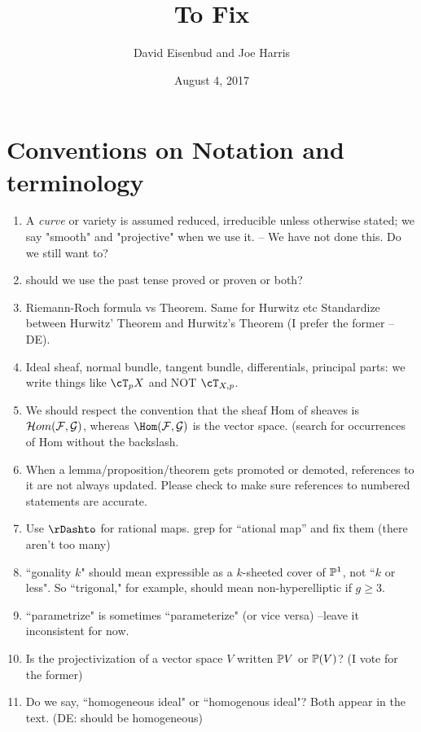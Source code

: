 \documentclass[12pt, leqno]{book}
\date{August 4, 2017}
\title{To Fix}
\author{David Eisenbud and Joe Harris }
\begin{document}
\maketitle

\setlength{\parskip}{5pt}

 
 \section{Conventions on Notation and terminology}
\begin{enumerate}

\item A \emph{curve} or variety is assumed  reduced, irreducible unless otherwise stated; we say "smooth" and "projective" when we use it. -- We have not done this. Do we still want to?

\item should we use the past tense proved or proven or both?

\item Riemann-Roch formula vs Theorem. Same for Hurwitz etc Standardize between Hurwitz' Theorem and Hurwitz's Theorem (I prefer the former -- DE).

\item Ideal sheaf, normal bundle, tangent bundle, differentials, principal parts: we write things like 
$\cT_{p}X$ and NOT $\cT_{X,p}$.  

\item We should respect the convention that the sheaf Hom of sheaves is
$\cH om(\cF,\cG)$, whereas $\Hom(\cF,\cG)$ is the vector space. (search for occurrences of Hom without the backslash.

\item When a lemma/proposition/theorem gets promoted or demoted, references to it are not always updated. Please check to make sure references to numbered statements are accurate. 

\item Use $\rDashto$ for rational maps. grep for ``ational map'' and fix them (there aren't too many) 

\item ``gonality $k$" should mean expressible as a $k$-sheeted cover of $\PP^1$, not ``$k$ or less". So ``trigonal," for example, should mean non-hyperelliptic if $g \geq 3$.

\item ``parametrize" is sometimes ``parameterize" (or vice versa) --leave it inconsistent for now.

\item Is the projectivization of a vector space $V$ written $\PP V$ or $\PP(V)$? (I vote for the former)

\item Do we say, ``homogeneous ideal" or ``homogenous ideal"? Both appear in the text.
(DE: should be homogeneous)

\end{enumerate}
\end{document}
